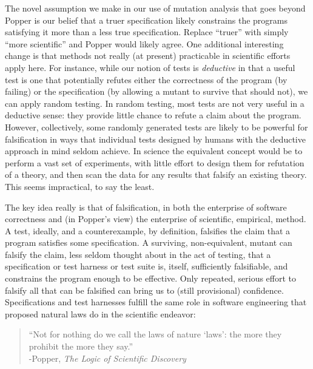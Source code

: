 \documentclass{svjour3}
\begin{document}
The novel assumption we make in our use of mutation analysis that goes
beyond Popper is our belief that a truer specification likely constrains
the programs satisfying it more than a less true specification.  Replace ``truer'' with
simply ``more scientific'' and Popper would likely agree.
One additional interesting change is that methods not really (at
present) practicable in scientific efforts apply here.  For instance,
while our notion of tests is \emph{deductive} in that a useful test is
one that potentially refutes either the correctness of the program (by
failing) or the specification (by allowing a mutant to survive that
should not), we can apply random testing.  In random testing, most
tests are not very useful in a deductive sense: they provide little
chance to refute a claim about the program.  However, collectively,
some randomly generated tests are likely to be powerful for
falsification in ways that individual tests designed by humans with
the deductive approach in mind seldom achieve.  In science the
equivalent concept would be to perform a vast set of experiments, with
little effort to design them for refutation of a theory, and then scan
the data for any results that falsify an existing theory.  This seems
impractical, to say the least.

The key idea really is that of falsification, in both the enterprise
of software correctness and (in Popper's view) the enterprise of
scientific, empirical, method.  A test, ideally, and a counterexample,
by definition, falsifies the claim that a program satisfies some
specification.  A surviving, non-equivalent, mutant can falsify the
claim, less seldom thought about in the act of testing, that a
specification or test harness or test suite is, itself, sufficiently
falsifiable, and constrains the program enough to be effective.  Only
repeated, serious effort to falsify all that can be falsified can
bring us to (still provisional) confidence.  Specifications and test
harnesses fulfill the same role in software engineering that proposed
natural laws do in the scientific endeavor:


\begin{quote}
``Not for nothing do we call the laws of nature `laws': the more they
prohibit the more they say.''\\
-Popper, \emph{The Logic of Scientific Discovery} \cite{Popper}
\end{quote}
\end{document}
